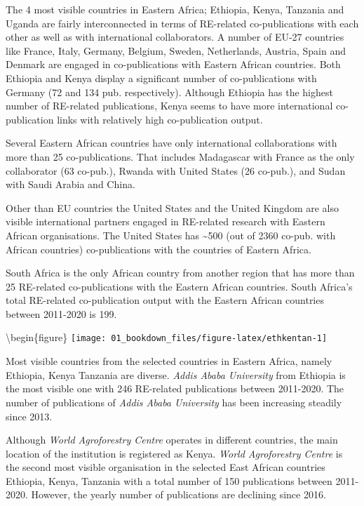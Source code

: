 \documentclass[12pt,twoside]{report}
\begin{document}
The 4 most visible countries in Eastern Africa; Ethiopia, Kenya, Tanzania and Uganda are fairly interconnected in terms of RE-related co-publications with each other as well as with international collaborators. A number of EU-27 countries like France, Italy, Germany, Belgium, Sweden, Netherlands, Austria, Spain and Denmark are engaged in co-publications with Eastern African countries. Both Ethiopia and Kenya display a significant number of co-publications with Germany (72 and 134 pub. respectively). Although Ethiopia has the highest number of RE-related publications, Kenya seems to have more international co-publication links with relatively high co-publication output.

Several Eastern African countries have only international collaborations with more than 25 co-publications. That includes Madagascar with France as the only collaborator (63 co-pub.), Rwanda with United States (26 co-pub.), and Sudan with Saudi Arabia and China.

Other than EU countries the United States and the United Kingdom are also visible international partners engaged in RE-related research with Eastern African organisations. The United States has \textasciitilde500 (out of 2360 co-pub. with African countries) co-publications with the countries of Eastern Africa.

South Africa is the only African country from another region that has more than 25 RE-related co-publications with the Eastern African countries. South Africa's total RE-related co-publication output with the Eastern African countries between 2011-2020 is 199.

\textbackslash begin\{figure\}
\texttt{[image: 01\_bookdown\_files/figure-latex/ethkentan-1]}

Most visible countries from the selected countries in Eastern Africa, namely Ethiopia, Kenya Tanzania are diverse. \emph{Addis Ababa University} from Ethiopia is the most visible one with 246 RE-related publications between 2011-2020. The number of publications of \emph{Addis Ababa University} has been increasing steadily since 2013.

Although \emph{World Agroforestry Centre} operates in different countries, the main location of the institution is registered as Kenya. \emph{World Agroforestry Centre} is the second most visible organisation in the selected East African countries Ethiopia, Kenya, Tanzania with a total number of 150 publications between 2011-2020. However, the yearly number of publications are declining since 2016.
\end{document}
